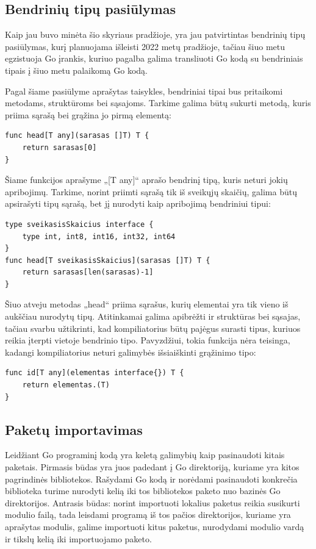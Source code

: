 \documentclass{VUMIFPSkursinis}
\begin{document}
\subsection{Bendrinių tipų pasiūlymas}
Kaip jau buvo minėta šio skyriaus pradžioje, yra jau patvirtintas bendrinių tipų pasiūlymas, kurį planuojama išleisti 2022 metų pradžioje, tačiau šiuo metu egzistuoja Go įrankis, kuriuo pagalba galima transliuoti Go kodą su bendriniais tipais į šiuo metu palaikomą Go kodą.\par Pagal šiame pasiūlyme aprašytas taisykles, bendriniai tipai bus pritaikomi metodams, struktūroms bei sąsajoms. Tarkime galima būtų sukurti metodą, kuris priima sąrašą bei grąžina jo pirmą elementą:
\begin{lstlisting}[language=GoCust] 
func head[T any](sarasas []T) T {
	return sarasas[0]
}
	\end{lstlisting}
Šiame funkcijos aprašyme „[T any]“ aprašo bendrinį tipą, kuris neturi jokių apribojimų. Tarkime, norint priimti sąrašą tik iš sveikųjų skaičių, galima būtų apsirašyti tipų sąrašą, bet jį nurodyti kaip apribojimą bendriniui tipui:
\begin{lstlisting}[language=GoCust]
type sveikasisSkaicius interface {
	type int, int8, int16, int32, int64
}
func head[T sveikasisSkaicius](sarasas []T) T {
	return sarasas[len(sarasas)-1]
}
	\end{lstlisting}
	Šiuo atveju metodas „head“ priima sąrašus, kurių elementai yra tik vieno iš aukščiau nurodytų tipų. Atitinkamai galima apibrėžti ir struktūras bei sąsajas, tačiau svarbu užtikrinti, kad kompiliatorius būtų pajėgus surasti tipus, kuriuos reikia įterpti vietoje bendrinio tipo. Pavyzdžiui, tokia funkcija nėra teisinga, kadangi kompiliatorius neturi galimybės išsiaiškinti grąžinimo tipo:
	\begin{lstlisting}[language=GoCust] 
func id[T any](elementas interface{}) T {
	return elementas.(T)
}
\end{lstlisting}
\subsection{Paketų importavimas}
Leidžiant Go programinį kodą yra keletą galimybių kaip pasinaudoti kitais paketais. Pirmasis būdas yra juos padedant į Go direktoriją, kuriame yra kitos pagrindinės bibliotekos. Rašydami Go kodą ir norėdami pasinaudoti konkrečia biblioteka turime nurodyti kelią iki tos bibliotekos paketo nuo bazinės Go direktorijos. Antrasis būdas: norint importuoti lokalius paketus reikia susikurti modulio failą, tada leisdami programą iš tos pačios direktorijos, kuriame yra aprašytas modulis, galime importuoti kitus paketus, nurodydami modulio vardą ir tikslų kelią iki importuojamo paketo.
\end{document}
